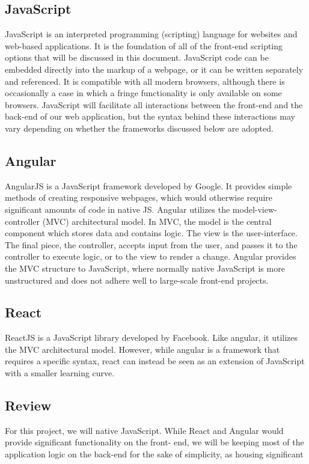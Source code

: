 \documentclass[onecolumn, draftclsnofoot,10pt, compsoc]{report}
\begin{document}
\subsection{JavaScript}
JavaScript is an interpreted programming (scripting) language for websites and web-based applications. It is the
foundation of all of the front-end scripting options that will be discussed in this document. JavaScript code can be
embedded directly into the markup of a webpage, or it can be written separately and referenced. It is compatible with
all modern browsers, although there is occasionally a case in which a fringe functionality is only available on some
browsers. JavaScript will facilitate all interactions between the front-end and the back-end of our web application, but
the syntax behind these interactions may vary depending on whether the frameworks discussed below are adopted.
\subsection{Angular}
AngularJS is a JavaScript framework developed by Google. It provides simple methods of creating responsive webpages,
which would otherwise require significant amounts of code in native JS. Angular utilizes the model-view-controller
(MVC) architectural model. In MVC, the model is the central component which stores data and contains logic. The view
is the user-interface. The final piece, the controller, accepts input from the user, and passes it to the controller to execute
logic, or to the view to render a change. Angular provides the MVC structure to JavaScript, where normally native
JavaScript is more unstructured and does not adhere well to large-scale front-end projects.
\subsection{React}
ReactJS is a JavaScript library developed by Facebook. Like angular, it utilizes the MVC architectural model. However,
while angular is a framework that requires a specific syntax, react can instead be seen as an extension of JavaScript with
a smaller learning curve.
\subsection{Review}
For this project, we will native JavaScript. While React and Angular would provide significant functionality on the front-
end, we will be keeping most of the application logic on the back-end for the sake of simplicity, as housing significant
\end{document}
